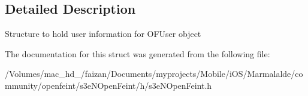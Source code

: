 \subsection{Detailed Description}
Structure to hold user information for OFUser object 

The documentation for this struct was generated from the following file:\begin{DoxyCompactItemize}
\item 
/Volumes/mac\_\-hd\_/faizan/Documents/myprojects/Mobile/iOS/Marmalalde/community/openfeint/s3eNOpenFeint/h/s3eNOpenFeint.h\end{DoxyCompactItemize}
